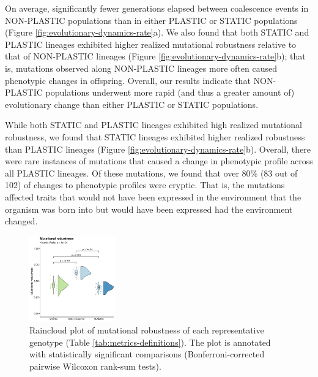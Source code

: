 \begin{raggedbottom}
On average, significantly fewer generations elapsed between coalescence events in NON-PLASTIC populations than in either PLASTIC or STATIC populations (Figure \ref{fig:evolutionary-dynamics-rate}a).
We also found that both STATIC and PLASTIC lineages exhibited higher realized mutational robustness relative to that of NON-PLASTIC lineages (Figure \ref{fig:evolutionary-dynamics-rate}b); that is, mutations observed along NON-PLASTIC lineages more often caused phenotypic changes in offspring.
Overall, our results indicate that NON-PLASTIC populations underwent more rapid (and thus a greater amount of) evolutionary change than either PLASTIC or STATIC populations.

While both STATIC and PLASTIC lineages exhibited high realized mutational robustness, we found that STATIC lineages exhibited higher realized robustness than PLASTIC lineages (Figure \ref{fig:evolutionary-dynamics-rate}b).
Overall, there were rare instances of mutations that caused a change in phenotypic profile across all PLASTIC lineages.
Of these mutations, we found that over 80\% (83 out of 102) of changes to phenotypic profiles were cryptic.
That is, the mutations affected traits that would not have been expressed in the environment that the organism was born into but would have been expressed had the environment changed.

\begin{figure}[ht!]
  \centering
  \includegraphics[width=0.33\textwidth]{02_consequences_of_plasticity/media/media-mutational-robustness.pdf}
  \caption{\small
      Raincloud plot of mutational robustness of each representative genotype (Table \ref{tab:metrics-definitions}).
      The plot is annotated with statistically significant comparisons (Bonferroni-corrected pairwise Wilcoxon rank-sum tests).
  }
  \label{fig:mutational-robustness}
\end{figure}


\end{raggedbottom}
